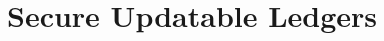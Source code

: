\documentclass[runningheads]{llncs}
\begin{document}


\clearpage





\section{Secure Updatable Ledgers}




\clearpage




\appendix





\end{document}
